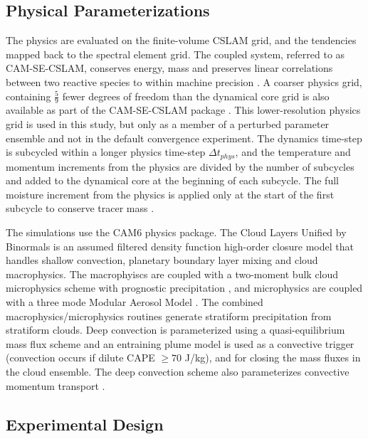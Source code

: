 \documentclass[times]{qjrms4}
\begin{document}
\subsection{Physical Parameterizations}

The physics are evaluated on the finite-volume CSLAM grid, and the tendencies mapped back to the spectral element grid. The coupled system, referred to as CAM-SE-CSLAM, conserves energy, mass and preserves linear correlations between two reactive species to within machine precision \citep{HL2018MWR}. A coarser physics grid, containing $\frac{5}{9}$ fewer degrees of freedom than the dynamical core grid is also available as part of the CAM-SE-CSLAM package \citep{HETAL2019JAMES}. This lower-resolution physics grid is used in this study, but only as a member of a perturbed parameter ensemble and not in the default convergence experiment. The dynamics time-step is subcycled within a longer physics time-step $\Delta t_{phys}$, and the temperature and momentum increments from the physics are divided by the number of subcycles and added to the dynamical core at the beginning of each subcycle. The full moisture increment from the physics is applied only at the start of the first subcycle to conserve tracer mass \citep[$ftype=2$ option in][]{LW2019JAMES}.

The simulations use the CAM6 physics package. The Cloud Layers Unified by Binormals \citep[CLUBB][]{GETAL2002JAS,BOG2013JCLIM} is an assumed filtered density function \citep{G1992JFM} high-order closure model that handles shallow convection, planetary boundary layer mixing and cloud macrophysics. The macrophyiscs are coupled with a two-moment bulk cloud microphysics scheme with prognostic precipitation \citep{MG2}, and microphysics are coupled with a three mode Modular Aerosol Model \citep{MAM}. The combined macrophysics/microphysics routines generate stratiform precipitation from stratiform clouds. Deep convection is parameterized using a quasi-equilibrium mass flux scheme \citep{ZM1995AO} and an entraining plume model \citep[referred to as the dilute convective available potential energy, or {\em{dilute CAPE}} hereafter;][]{RB1992JAS, NRJ2008JC} is used as a convective trigger (convection occurs if dilute CAPE $\geq 70$ J/kg), and for closing the mass fluxes in the cloud ensemble. The deep convection scheme also parameterizes convective momentum transport \citep{RR2008JC}.

\subsection{Experimental Design}
 
\end{document}

